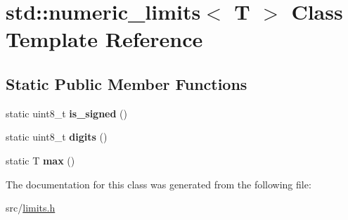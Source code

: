 \hypertarget{classstd_1_1numeric__limits}{}\section{std\+:\+:numeric\+\_\+limits$<$ T $>$ Class Template Reference}
\label{classstd_1_1numeric__limits}
\subsection*{Static Public Member Functions}
\begin{DoxyCompactItemize}
\item 
\hypertarget{classstd_1_1numeric__limits_a0c0397b435b08d7f7b629dc264ad6b39}{}\label{classstd_1_1numeric__limits_a0c0397b435b08d7f7b629dc264ad6b39} 
static uint8\+\_\+t {\bfseries is\+\_\+signed} ()
\item 
\hypertarget{classstd_1_1numeric__limits_aa7a4f181eb6e5b26661ed2c6c6ab653b}{}\label{classstd_1_1numeric__limits_aa7a4f181eb6e5b26661ed2c6c6ab653b} 
static uint8\+\_\+t {\bfseries digits} ()
\item 
\hypertarget{classstd_1_1numeric__limits_ae5fc707d9d6ebbac808a5fb6e26690f8}{}\label{classstd_1_1numeric__limits_ae5fc707d9d6ebbac808a5fb6e26690f8} 
static T {\bfseries max} ()
\end{DoxyCompactItemize}


The documentation for this class was generated from the following file\+:\begin{DoxyCompactItemize}
\item 
src/\hyperlink{limits_8h}{limits.\+h}\end{DoxyCompactItemize}

